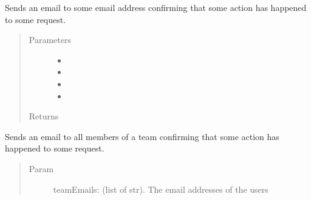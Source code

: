 \documentclass[letterpaper,10pt,english]{sphinxmanual}
\begin{document}
\begin{fulllineitems}
\begin{fulllineitems}
\label{\detokenize{apidoc/utdesign_procurement:utdesign_procurement.emailer.EmailHandler.confirmRequestManagerAdmin}}
Sends an email to some email address confirming that some
action has happened to some request.
\begin{quote}\begin{description}
\item[{Parameters}] \leavevmode\begin{itemize}
\item {} 
 \textendash{} 

\item {} 
 \textendash{} 

\item {} 
 \textendash{} 

\item {} 
 \textendash{} 

\end{itemize}

\item[{Returns}] \leavevmode


\end{description}\end{quote}

\end{fulllineitems}


\begin{fulllineitems}
\label{\detokenize{apidoc/utdesign_procurement:utdesign_procurement.emailer.EmailHandler.confirmStudent}}
Sends an email to all members of a team confirming that some
action has happened to some request.
\begin{quote}\begin{description}
\item[{Param}] \leavevmode
teamEmails: (list of str). The email addresses of the users


\end{description}
\end{quote}
\end{fulllineitems}
\end{fulllineitems}
\end{document}
